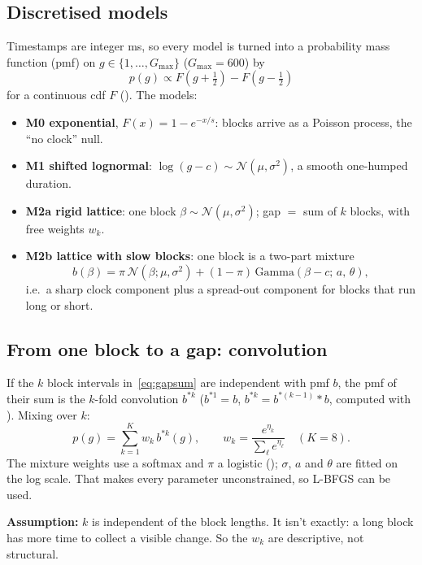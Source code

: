 \documentclass[11pt,a4paper]{article}
\newcommand{\code}[1]{\texttt{\detokenize{#1}}}
\begin{document}
\subsection{Discretised models}
Timestamps are integer ms, so every model is turned into a probability mass function (pmf) on $g\in\{1,\dots,G_{\max}\}$ ($G_{\max}=600$) by
\begin{equation}
  p(g)\propto F(g+\tfrac12)-F(g-\tfrac12)
\end{equation}
for a continuous cdf $F$ (\code{_disc}). The models:
\begin{itemize}
  \item \textbf{M0 exponential}, $F(x)=1-e^{-x/s}$: blocks arrive as a Poisson process, the ``no clock'' null.
  \item \textbf{M1 shifted lognormal}: $\log(g-c)\sim\mathcal N(\mu,\sigma^2)$, a smooth one-humped duration.
  \item \textbf{M2a rigid lattice}: one block $\beta\sim\mathcal N(\mu,\sigma^2)$; gap $=$ sum of $k$ blocks, with free weights $w_k$.
  \item \textbf{M2b lattice with slow blocks}: one block is a two-part mixture
        \begin{equation}\label{eq:blockpmf}
          b(\beta) = \pi\,\mathcal N(\beta;\mu,\sigma^2) + (1-\pi)\,\mathrm{Gamma}(\beta-c;\,a,\,\theta),
        \end{equation}
        i.e.\ a sharp clock component plus a spread-out component for blocks that run long or short.
\end{itemize}

\subsection{From one block to a gap: convolution}
If the $k$ block intervals in~\eqref{eq:gapsum} are independent with pmf $b$, the pmf of their sum is the $k$-fold convolution $b^{*k}$
($b^{*1}=b$, $b^{*k}=b^{*(k-1)}*b$, computed with \code{np.convolve}). Mixing over $k$:
\begin{equation}\label{eq:lattice}
  p(g) = \sum_{k=1}^{K} w_k\, b^{*k}(g),\qquad w_k = \frac{e^{\eta_k}}{\sum_{\ell}e^{\eta_\ell}}\quad(K=8).
\end{equation}
The mixture weights use a softmax and $\pi$ a logistic (\code{expit}); $\sigma$, $a$ and $\theta$ are fitted on the log scale. That makes every parameter unconstrained, so
L-BFGS can be used.

\begin{warn}
\textbf{Assumption:} $k$ is independent of the block lengths. It isn't exactly: a long block has more time to collect a visible change. So the $w_k$ are
descriptive, not structural.
\end{warn}
\end{document}
